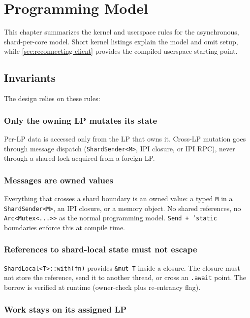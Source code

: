 \chapter{Programming Model}
\label{chap:programming-model}

This chapter summarizes the kernel and userspace rules for the asynchronous,
shard-per-core model. Short kernel listings explain the model and omit setup, while
\autoref{sec:reconnecting-client} provides the compiled userspace starting point.

\section{Invariants}

The design relies on these rules:

\subsection{Only the owning LP mutates its state}

Per-LP data is accessed only from the LP that owns it. Cross-LP mutation goes
through message dispatch (\texttt{ShardSender<M>}, IPI closure, or IPI RPC),
never through a shared lock acquired from a foreign LP.

\subsection{Messages are owned values}

Everything that crosses a shard boundary is an owned value: a typed
\texttt{M} in a \texttt{ShardSender<M>}, an IPI closure, or a memory object.
No shared references, no \texttt{Arc<Mutex<...>{>}} as the normal programming
model. \texttt{Send + 'static} boundaries enforce this at compile time.

\subsection{References to shard-local state must not escape}

\texttt{ShardLocal<T>::with(fn)} provides \texttt{\&mut T} inside a closure.
The closure must not store the reference, send it to another thread, or cross
an \texttt{.await} point. The borrow is verified at runtime (owner-check plus
re-entrancy flag).

\subsection{Work stays on its assigned LP}

